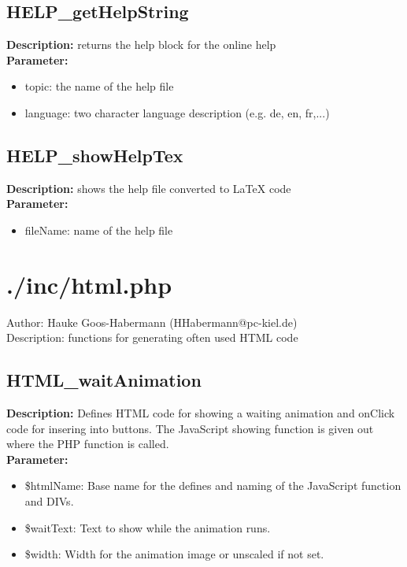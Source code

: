 \subsection{HELP\_getHelpString}
\textbf{Description:} returns the help block for the online help\\
\textbf{Parameter:}
\begin{itemize}
\item topic: the name of the help file
\item language: two character language description (e.g. de, en, fr,...)
\end{itemize}

\subsection{HELP\_showHelpTex}
\textbf{Description:} shows the help file converted to LaTeX code\\
\textbf{Parameter:}
\begin{itemize}
\item fileName: name of the help file
\end{itemize}

\newpage\section{./inc/html.php}
 Author: Hauke Goos-Habermann (HHabermann@pc-kiel.de)\\
 Description: functions for generating often used HTML code\\

\subsection{HTML\_waitAnimation}
\textbf{Description:} Defines HTML code for showing a waiting animation and onClick code for insering into buttons. The JavaScript showing function is given out where the PHP function is called.\\
\textbf{Parameter:}
\begin{itemize}
\item \$htmlName: Base name for the defines and naming of the JavaScript function and DIVs.
\item \$waitText: Text to show while the animation runs.
\item \$width: Width for the animation image or unscaled if not set.
\end{itemize}

